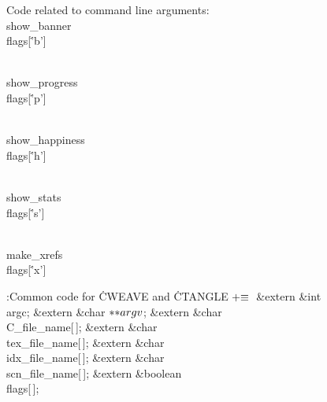 Code related to command line arguments:
\Y\B\4\D\\{show\_banner}\5
\\{flags}[\.{'b'}]\par
\B\4\D\\{show\_progress}\5
\\{flags}[\.{'p'}]\par
\B\4\D\\{show\_happiness}\5
\\{flags}[\.{'h'}]\par
\B\4\D\\{show\_stats}\5
\\{flags}[\.{'s'}]\par
\B\4\D\\{make\_xrefs}\5
\\{flags}[\.{'x'}]\par
\Y\B\4:Common code for \.{CWEAVE} and \.{CTANGLE}\X${}\mathrel+\equiv{}$\6
\&{extern} \&{int} \\{argc};\6
\&{extern} \&{char} ${}{*}{*}\\{argv}{}$;\6
\&{extern} \&{char} \\{C\_file\_name}[\,];\6
\&{extern} \&{char} \\{tex\_file\_name}[\,];\6
\&{extern} \&{char} \\{idx\_file\_name}[\,];\6
\&{extern} \&{char} \\{scn\_file\_name}[\,];\6
\&{extern} \&{boolean} \\{flags}[\,];\par
\fi

